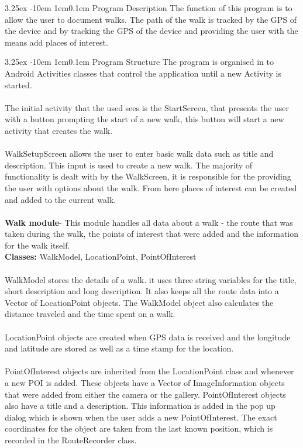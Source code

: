 \documentclass[12pt]{article}
\makeatletter
\renewcommand{\paragraph}{
  \@startsection{paragraph}{4}
  {\z@}{3.25ex \@plus -10em \@minus 1em}{0.1em}
  {\normalfont\normalsize\bfseries}
}
\makeatother
\begin{document}
\paragraph{Program Description}
The function of this program is to allow the user to document walks. The path of the walk is tracked by the GPS of the device and by tracking the GPS of the device and providing the user with the means add places of interest.
\paragraph{Program Structure}
The program is organised in to Android Activities classes that control the application until a new Activity is started.
\\\\
The initial activity that the used sees is the StartScreen, that presents the user with a button prompting the start of a new walk, this button will start a new activity that creates the walk.
\\\\
WalkSetupScreen allows the user to enter basic walk data such as title and description. This input is used to create a new walk.
The majority of  functionality is dealt with by the WalkScreen, it is responsible for the providing the user with options about the walk. From here places of interest can be created and added to the current walk.
\\\\
\textbf{Walk module}- This module handles all data about a walk - the route that was taken during the walk, the points of interest that were added and the information for the walk itself.
~\\
\textbf{Classes:} WalkModel, LocationPoint, PointOfInterest~\\\\
WalkModel stores the details of a walk. it uses three string variables for the title, short description and long description. It also keeps all the route data into a Vector of LocationPoint objects. The WalkModel object also calculates the distance traveled and the time spent on a walk.
~\\\\
LocationPoint objects are created when GPS data is received and the longitude and latitude are stored as well as a time stamp for the location.
~\\\\
PointOfInterest objects are inherited from the LocationPoint class and whenever a new POI is added. These objects have a Vector of ImageInformation objects that were added from either the camera or the gallery. PointOfInterest objects also have a title and a description. This information is added in the pop up dialog which is shown when the user adds a new PointOfInterest. The exact coordinates for the object are taken from the last known position, which is recorded in the RouteRecorder class.
\end{document}
